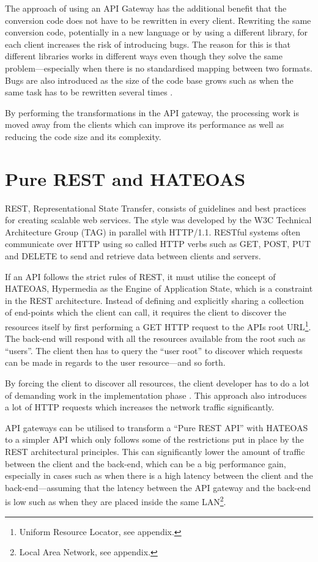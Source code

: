 \documentclass{cslthse-msc}
\begin{document}
The approach of using an API Gateway has the additional benefit that the conversion code does not have to be rewritten in every client. Rewriting the same conversion code, potentially in a new language or by using a different library, for each client increases the risk of introducing bugs. The reason for this is that different libraries works in different ways even though they solve the same problem---especially when there is no standardised mapping between two formats. Bugs are also introduced as the size of the code base grows such as when the same task has to be rewritten several times \cite[page 521]{code_complete}. 

By performing the transformations in the API gateway, the processing work is moved away from the clients which can improve its performance as well as reducing the code size and its complexity.

\section{Pure REST and HATEOAS}
REST, Representational State Transfer, consists of guidelines and best practices for creating scalable web services. The style was developed by the W3C Technical Architecture Group (TAG) in parallel with HTTP/1.1. RESTful systems often communicate over HTTP using so called HTTP verbs such as GET, POST, PUT and DELETE to send and retrieve data between clients and servers. 

If an API follows the strict rules of REST, it must utilise the concept of HATEOAS, Hypermedia as the Engine of Application State, which is a constraint in the REST architecture. Instead of defining and explicitly sharing a collection of end-points which the client can call, it requires the client to discover the resources itself by first performing a GET HTTP request to the APIs root URL\footnote{Uniform Resource Locator, see appendix.}. The back-end will respond with all the resources available from the root such as \enquote{users}. The client then has to query the \enquote{user root} to discover which requests can be made in regards to the user resource---and so forth. 

By forcing the client to discover all resources, the client developer has to do a lot of demanding work in the implementation phase \cite[page 62]{AASG}. This approach also introduces a lot of HTTP requests which increases the network traffic significantly.

API gateways can be utilised to transform a \enquote{Pure REST API} with HATEOAS to a simpler API which only follows some of the restrictions put in place by the REST architectural principles. This can significantly lower the amount of traffic between the client and the back-end, which can be a big performance gain, especially in cases such as when there is a high latency between the client and the back-end---assuming that the latency between the API gateway and the back-end is low such as when they are placed inside the same LAN\footnote{Local Area Network, see appendix.}.
\end{document}
